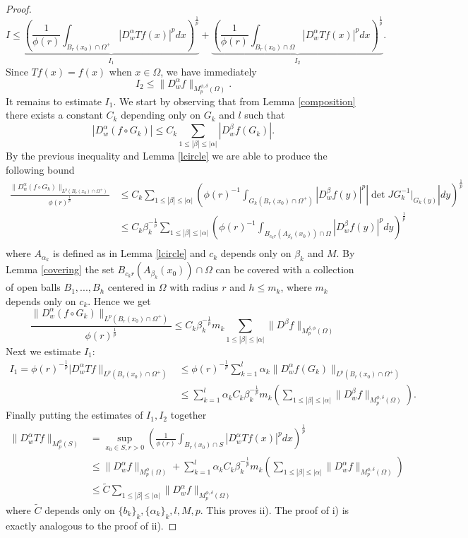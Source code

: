 \documentclass[12pt]{article}
\theoremstyle{definition}
\begin{document}
\begin{proof}
\[ I \le \underbrace{\left ( \frac{1}{\phi(r)} \int_{B_r(x_0)\cap \Omega^+} |D^\alpha_w Tf(x)|^pdx \right)^{\frac{1}{p}}}_\textrm{$I_1$}+\underbrace{\left ( \frac{1}{\phi(r)} \int_{B_r(x_0)\cap \Omega} |D^\alpha_w Tf(x)|^pdx \right)^{\frac{1}{p}}}_\textrm{$I_2$}.\]
Since $Tf(x)=f(x)$ when $ x\in\Omega$, we have immediately  
\[ I_2 \le \|D^\alpha_w f \|_{M_p^{\phi,\delta}(\Omega)} . \]
It remains to estimate $I_1$. We start by observing that from Lemma \ref{composition} there exists a constant $C_k$ depending only on $G_k$ and $l$ such that
\[ |D^{\alpha}_w (f \circ  G_k)| \le C_k \sum_{1\le |\beta|\le|\alpha| }| D^{\beta}_wf(G_k)|.\]
By the previous inequality and Lemma \ref{lcircle} we are able to produce the following bound
\begin{align*}
 \frac{\|D^{\alpha}_w(f \circ G_k) \|_{L^p(B_r(x_0)\cap \Omega^+)}}{\phi(r)^{\frac{1}{p}}} &\le C_k \sum_{1\le |\beta|\le|\alpha| } \left(\phi(r)^{-1} \int_{G_k(B_r(x_0)\cap \Omega^+)} |D^\beta_wf(y)|^p|\det JG_k^{-1}\big|_{G_k(y)}|dy\right)^{\frac{1}{p}}\\
 		&\le C_k \beta_k^{-\frac{1}{p}} \sum_{1\le |\beta|\le|\alpha| } \left(\phi(r)^{-1} \int_{B_{c_kr}(A_{\beta_k}(x_0))\cap \Omega} |D^\beta_wf(y)|^pdy\right)^{\frac{1}{p}} 		\\		
\end{align*}
where $A_{\alpha_k}$ is defined as in Lemma \ref{lcircle} and $c_k$ depends only on $\beta_k$ and $M$. By Lemma \ref{covering} the set $B_{c_kr}(A_{\beta_k}(x_0))\cap \Omega$ can be covered with a collection of open balls $B_1,...,B_h$ centered in $\Omega$ with radius $r$ and $h\le m_k$, where $m_k$ depends only on $c_k$. Hence we get
\[ \frac{\|D^{\alpha}_w(f \circ G_k) \|_{L^p(B_r(x_0)\cap \Omega^+)}}{\phi(r)^{\frac{1}{p}}}\le C_k \beta_k^{-\frac{1}{p}} m_k \sum_{1\le |\beta|\le|\alpha| } \|D^\beta f\|_{M_p^{\delta,\phi}(\Omega)}\]
 Next we estimate $I_1$:
\begin{align*}
I_1 = \phi(r)^{-\frac{1}{p}}|D^\alpha_w Tf \|_{L^p(B_r(x_0)\cap \Omega^+)}&\le \phi(r)^{-\frac{1}{p}} \sum_{k=1}^l \alpha_k \|D^\alpha_w f(G_k) \|_{L^p(B_r(x_0)\cap \Omega^+)} \\
&\le \sum_{k=1}^l \alpha_kC_k\beta_k^{-\frac{1}{p}}m_k \left( \sum_{1\le |\beta|\le|\alpha| }\| D^\beta_wf\|_{M_p^{\phi,\delta}(\Omega)} \right).																	
\end{align*}
Finally putting the estimates of $I_1,I_2$ together 
\begin{align*}
\| D^\alpha_w Tf\|_{M_p^\phi(S)}&=\sup_{x_0 \in S, r>0} \left ( \frac{1}{\phi(r)} \int_{B_r(x_0)\cap S} |D^\alpha_w Tf(x)|^pdx \right)^{\frac{1}{p}} \\
									&\le \|D^\alpha_w f \|_{M_p^\phi(\Omega)}+\sum_{k=1}^l \alpha_kC_k\beta_k^{-\frac{1}{p}}m_k \left( \sum_{1\le |\beta|\le|\alpha| }\| D^\alpha_wf\|_{M_p^{\phi,\delta}(\Omega)} \right) \\
									& \le \widetilde C\sum_{1\le |\beta|\le|\alpha| }\| D^\alpha_wf\|_{M_p^{\phi,\delta}(\Omega)}
\end{align*}
where $\widetilde C$ depends only on $\{b_k\}_k,\{\alpha_k\}_k,l,M,p$. This proves ii). The proof of i) is exactly analogous to the proof of ii).
\end{proof}
\end{document}
